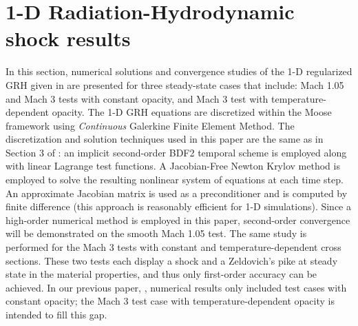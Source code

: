 \documentclass[times,doublespace]{fldauth}%
\begin{document}
%
\section{1-D Radiation-Hydrodynamic shock results}
\label{sec:num-rslt}
%
In this section, numerical solutions and convergence studies of the 1-D regularized GRH given in  are presented for three steady-state cases that include: Mach 1.05 and Mach 3 tests with constant opacity, and Mach 3 test with temperature-dependent opacity. The 1-D GRH equations are discretized within the Moose framework \cite{Moose} using \emph{Continuous} Galerkine Finite Element Method. The discretization and solution techniques used in this paper are the same as in Section 3 of \cite{our_jcp_radhy_paper}: an implicit second-order BDF2 temporal scheme is employed \cite{bdf2} along with linear Lagrange test functions. A Jacobian-Free Newton Krylov method \cite{JFNK} is employed to solve the resulting nonlinear system of equations at each time step. An approximate Jacobian matrix is used as a preconditioner and is computed by finite difference (this approach is reasonably efficient for 1-D simulations). 
Since a high-order numerical method is employed in this paper, second-order convergence will be demonstrated on the smooth Mach 1.05 test. The same study is performed for the Mach 3 tests with constant and temperature-dependent cross sections. These two tests each display a shock and a Zeldovich's pike at steady state in the material properties, and thus only first-order accuracy can be achieved. In our previous paper, \cite{our_jcp_radhy_paper}, numerical results only included test cases with constant opacity; the Mach 3 test case with temperature-dependent opacity is intended to fill this gap.
\end{document}
